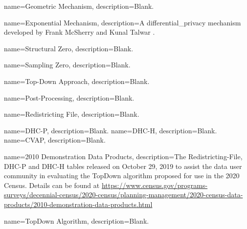{
    name=Geometric Mechanism,
    description={Blank.
    } 
}

{
    name=Exponential Mechanism,
    description={A \gls{differential_privacy} mechanism developed by Frank McSherry and Kunal Talwar \parencite{mcsherry_mechanism_2007}.
    } 
}

{
    name=Structural Zero,
    description={Blank.
    } 
}

{
    name=Sampling Zero,
    description={Blank.
    } 
}

{
    name=Top-Down Approach,
    description={Blank.
    } 
}

{
    name=Post-Processing,
    description={Blank.
    } 
}

{
name={Redistricting File},
description={Blank.}
}

{
name={DHC-P},
description={Blank.}
}
{
name={DHC-H},
description={Blank.}
}
{
name={CVAP},
description={Blank.}
}

{
    name=2010 Demonstration Data Products,
    description={The \gls{Redistricting-File}, \gls{DHC-P} and \gls{DHC-H} tables released on October 29, 2019 to assist the data user community in evaluating the \gls{TopDown} algorithm proposed for use in the 2020 Census. Details can be found at \url{https://www.census.gov/programs-surveys/decennial-census/2020-census/planning-management/2020-census-data-products/2010-demonstration-data-products.html}}
}

{
 name={TopDown Algorithm},
 description={Blank.}
}

